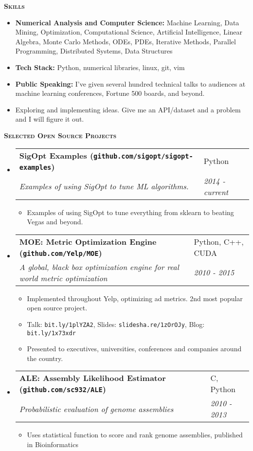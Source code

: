 \documentclass[11pt]{article}
\makeatletter
\newcommand{\resitem}[1]{\item #1 \vspace{-2pt}}
\newcommand{\resheading}[1]{%
  \begin{tcolorbox}
    \textsc{\textbf{\large{#1}}}
  \end{tcolorbox}
}
\newcommand{\ressubheading}[4]{%
  \begin{tabularx}{\linewidth}{@{}Xl@{}}
    \textbf{#1} & #2          \\
    \textit{#3} & \textit{#4} \\
  \end{tabularx}
}
\makeatother
\begin{document}

\resheading{Skills}


\begin{itemize}

\item {\bf Numerical Analysis and Computer Science:} Machine Learning, Data Mining, Optimization, Computational Science, Artificial Intelligence, Linear Algebra, Monte Carlo Methods, ODEs, PDEs, Iterative Methods, Parallel Programming, Distributed Systems, Data Structures

\item {\bf Tech Stack:} Python, numerical libraries, linux, git, vim

\item {\bf Public Speaking:} I've given several hundred technical talks to audiences at machine learning conferences, Fortune 500 boards, and beyond.

\item Exploring and implementing ideas. Give me an API/dataset and a problem and I will figure it out.

\end{itemize}


\resheading{Selected Open Source Projects}


\begin{itemize}

\item
    \ressubheading{SigOpt Examples (\texttt{github.com/sigopt/sigopt-examples})}{Python}{Examples of using SigOpt to tune ML algorithms.}{2014 - current}
    \begin{itemize}
        \resitem{Examples of using SigOpt to tune everything from sklearn to beating Vegas and beyond.}
	\end{itemize}

\item
    \ressubheading{MOE: Metric Optimization Engine (\texttt{github.com/Yelp/MOE})}{Python, C++, CUDA}{A global, black box optimization engine for real world metric optimization}{2010 - 2015}
    \begin{itemize}
        \resitem{Implemented throughout Yelp, optimizing ad metrics. 2nd most popular open source project.}
        \resitem{Talk: \texttt{bit.ly/1plYZA2}, Slides: \texttt{slidesha.re/1zOrOJy}, Blog: \texttt{bit.ly/1x73xdr}}
        \resitem{Presented to executives, universities, conferences and companies around the country.}
	\end{itemize}

\item
    \ressubheading{ALE: Assembly Likelihood Estimator (\texttt{github.com/sc932/ALE})}{C, Python}{Probabilistic evaluation of genome assemblies}{2010 - 2013}
    \begin{itemize}
        \resitem{Uses statistical function to score and rank genome assemblies, published in Bioinformatics}
	\end{itemize}

\end{itemize}
\end{document}

